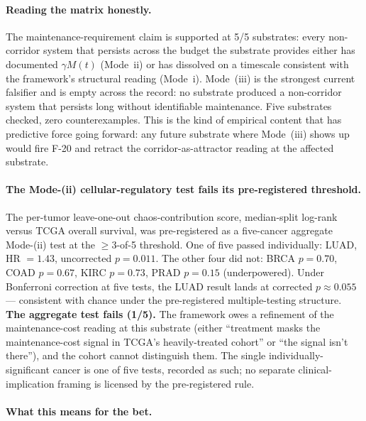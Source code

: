 \documentclass[11pt,a4paper]{article}
\begin{document}
\paragraph{Reading the matrix honestly.} The maintenance-requirement claim is supported at 5/5 substrates: every non-corridor system that persists across the budget the substrate provides either has documented $\gamma M(t)$ (Mode~ii) or has dissolved on a timescale consistent with the framework's structural reading (Mode~i). Mode~(iii) is the strongest current falsifier and is empty across the record: no substrate produced a non-corridor system that persists long without identifiable maintenance. Five substrates checked, zero counterexamples. This is the kind of empirical content that has predictive force going forward: any future substrate where Mode~(iii) shows up would fire F-20 and retract the corridor-as-attractor reading at the affected substrate.

\paragraph{The Mode-(ii) cellular-regulatory test fails its pre-registered threshold.}

The per-tumor leave-one-out chaos-contribution score, median-split log-rank versus TCGA overall survival, was pre-registered as a five-cancer aggregate Mode-(ii) test at the $\ge 3$-of-5 threshold. One of five passed individually: LUAD, HR $= 1.43$, uncorrected $p = 0.011$. The other four did not: BRCA $p = 0.70$, COAD $p = 0.67$, KIRC $p = 0.73$, PRAD $p = 0.15$ (underpowered). Under Bonferroni correction at five tests, the LUAD result lands at corrected $p \approx 0.055$ --- consistent with chance under the pre-registered multiple-testing structure. \textbf{The aggregate test fails (1/5).} The framework owes a refinement of the maintenance-cost reading at this substrate (either ``treatment masks the maintenance-cost signal in TCGA's heavily-treated cohort'' or ``the signal isn't there''), and the cohort cannot distinguish them. The single individually-significant cancer is one of five tests, recorded as such; no separate clinical-implication framing is licensed by the pre-registered rule.

\paragraph{What this means for the bet.}
\end{document}
